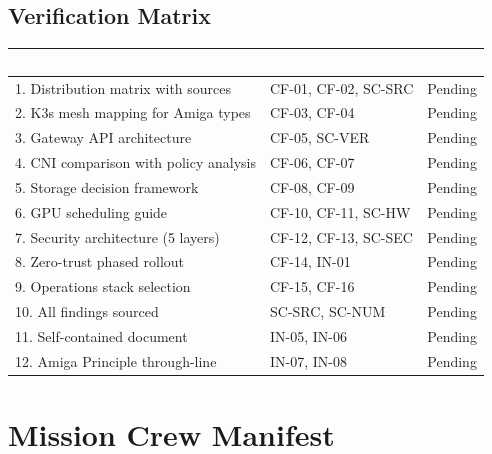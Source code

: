 \documentclass[11pt,letterpaper]{article}
\newcommand{\tableheader}[1]{\textbf{\sffamily\textcolor{white}{#1}}}
\begin{document}
\subsection{Verification Matrix}

\begin{center}
\begin{tabularx}{\textwidth}{XL{3cm}C{1.5cm}}
\toprule
{}
\tableheader{Success Criterion} & \tableheader{Test ID(s)} & \tableheader{Status} \\
. Distribution matrix with sources & CF-01, CF-02, SC-SRC & Pending \\
2. K3s mesh mapping for Amiga types & CF-03, CF-04 & Pending \\
3. Gateway API architecture & CF-05, SC-VER & Pending \\
4. CNI comparison with policy analysis & CF-06, CF-07 & Pending \\
5. Storage decision framework & CF-08, CF-09 & Pending \\
6. GPU scheduling guide & CF-10, CF-11, SC-HW & Pending \\
7. Security architecture (5 layers) & CF-12, CF-13, SC-SEC & Pending \\
8. Zero-trust phased rollout & CF-14, IN-01 & Pending \\
9. Operations stack selection & CF-15, CF-16 & Pending \\
10. All findings sourced & SC-SRC, SC-NUM & Pending \\
11. Self-contained document & IN-05, IN-06 & Pending \\
12. Amiga Principle through-line & IN-07, IN-08 & Pending \\
\bottomrule
\end{tabularx}
\end{center}

\section{Mission Crew Manifest}
\end{document}

